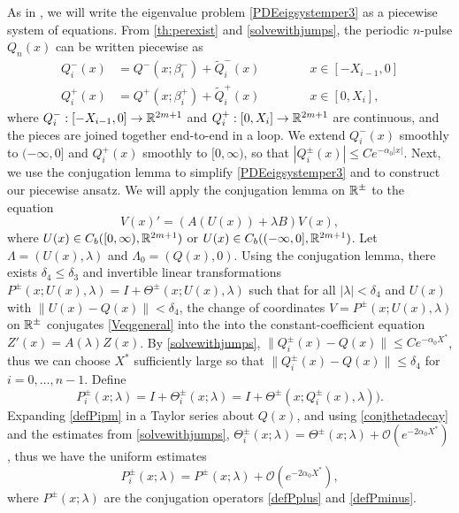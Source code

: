 \documentclass[12pt]{elsarticle}
\theoremstyle{plain}
\theoremstyle{definition}
\theoremstyle{remark}
\numberwithin{theorem}{section}
\numberwithin{equation}{section}
\begin{document}
As in \cite{Sandstede1998}, we will write the eigenvalue problem \cref{PDEeigsystemper3} as a piecewise system of equations. From \cref{th:perexist} and \cref{solvewithjumps}, the periodic $n$-pulse $Q_n(x)$ can be written piecewise as
\begin{equation}\label{Qnppiece}
\begin{aligned}
Q_i^-(x) &= Q^-(x; \beta_i^-) + \tilde{Q}_i^-(x) \qquad\qquad x \in [-X_{i-1}, 0] \\
Q_i^+(x) &= Q^+(x; \beta_i^+) + \tilde{Q}_i^+(x) \qquad\qquad x \in [0, X_i],
\end{aligned}
\end{equation}
where $Q_i^-: [-X_{i-1}, 0] \rightarrow \mathbb{R}^{2m+1}$ and $Q_i^+: [0, X_i] \rightarrow \mathbb{R}^{2m+1}$ are continuous, and the pieces are joined together end-to-end in a loop. We extend $Q_i^-(x)$ smoothly to $(-\infty, 0]$ and $Q_i^+(x)$ smoothly to $[0, \infty)$, so that $|Q_i^\pm(x)| \leq C e^{-\alpha_0 |x|}$. Next, we use the conjugation lemma to simplify \cref{PDEeigsystemper3} and to construct our piecewise ansatz. We will apply the conjugation lemma on $\mathbb{R}^\pm$ to the equation
\begin{equation}\label{Veqgeneral}
V(x)' = ( A(U(x)) + \lambda B)  V(x),
\end{equation}
where $U(x) \in C_b([0, \infty), \mathbb{R}^{2m+1})$ or $U(x) \in C_b((-\infty, 0], \mathbb{R}^{2m+1})$. Let $\Lambda = (U(x), \lambda)$ and $\Lambda_0 = (Q(x), 0)$. Using the conjugation lemma, there exists $\delta_4 \leq \delta_3$ and invertible linear transformations $P^\pm(x; U(x), \lambda) = I + \Theta^\pm(x; U(x), \lambda)$ such that for all $|\lambda| < \delta_4$ and $U(x)$ with $\| U(x) - Q(x) \| < \delta_4$, the change of coordinates $V = P^\pm(x; U(x), \lambda)$ on $\mathbb{R}^\pm$ conjugates \cref{Veqgeneral} into the into the constant-coefficient equation $Z'(x) = A(\lambda) Z(x)$. By \cref{solvewithjumps}, $\| Q_i^\pm(x) - Q(x) \| \leq C e^{-\alpha_0 X^*}$, thus we can choose $X^*$ sufficiently large so that $\| Q_i^\pm(x) - Q(x) \| \leq \delta_4$ for $i = 0, \dots, n-1$. Define
\begin{equation}\label{defPipm}
P_i^\pm(x; \lambda) = I + \Theta_i^\pm(x; \lambda) = I + \Theta^\pm(x; Q_i^\pm(x), \lambda)).
\end{equation}
Expanding \cref{defPipm} in a Taylor series about $Q(x)$, and using \cref{conjthetadecay} and the estimates from \cref{solvewithjumps}, $\Theta_i^\pm(x; \lambda) = \Theta^\pm(x; \lambda) + \mathcal{O}(e^{-2 \alpha_0 X^*})$, thus we have the uniform estimates
\begin{equation}\label{Pipmest}
P_i^\pm(x; \lambda) = P^\pm(x; \lambda) + \mathcal{O}(e^{-2 \alpha_0 X^*}),
\end{equation}
where $P^\pm(x; \lambda)$ are the conjugation operators \cref{defPplus} and \cref{defPminus}.
\end{document}
